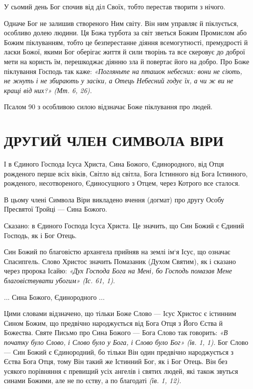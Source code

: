 \documentclass[main.tex]{subfiles}
\begin{document}
У сьомий день Бог спочив від діл Своїх, тобто перестав творити з нічого.

Одначе Бог не залишив створеного Ним світу. Він ним управляє й піклується, особливо долею людини. Ця Божа турбота за світ зветься Божим Промислом або Божим піклуванням, тобто це безперестанне діяння всемогутності, премудрості й ласки Божої, якими Бог оберігає життя й сили творінь та все скеровує до доброї мети на користь їм, перешкоджає діянню зла й повертає його на добро. Про Боже піклування Господь так каже: \emph{{\color{red} «Погляньте на пташок небесних: вони не сіють, не жнуть і не збирають у засіки, а Отець Небесний годує їх, а чи ж ви не кращі від них?»} (Мт. 6, 26).}

Псалом 90 з особливою силою відзначає Боже піклування про людей.

\section{ДРУГИЙ ЧЛЕН СИМВОЛА ВІРИ}
\begin{FlushRight}
    І в Єдиного Господа Ісуса Христа, Сина Божого, Єдинородного, від Отця рожденого перше всіх віків, Світло від світла, Бога Істинного від Бога Істинного, рожденого, несотвореного, Єдиносущного з Отцем, через Котрого все сталося.
\end{FlushRight}

В цьому члені Символа Віри викладено вчення (догмат) про другу Особу Пресвятої Тройці — Сина Божого.

Сказано: в Єдиного Господа Ісуса Христа. Це значить, що Син Божий є Єдиний Господь, як і Бог Отець.
 
Син Божий по благовістю архангела прийняв на землі ім`я Ісус, що означає Спасипгель. Слово Христос значить Помазаник (Духом Святим), як і сказано через пророка Ісайю: \emph{{\color{red} «Дух Господа Бога на Мені, бо Господь помазав Мене благовіствувати убогим»} (Іс. 61, 1)}.

... Сина Божого, Єдинородного ...

Цими словами відзначено, що тільки Боже Слово — Ісус Христос є істинним Сином Божим, що предвічно народжується від Бога Отця з Його Єства й Божества. Святе Письмо про Сина Божого — Бога Слово так говорить: \emph{«В початку було Слово, і Слово було у Бога, і Слово було Бог» (їв. 1, 1).}
Бог Слово — Син Божий є Єдинородний, бо тільки Він один предвічно народжується з Єства Бога Отця, тому Він такий же Істинний Бог, як і Бог Отець. Він без усякого порівняння є превищий усіх ангелів і святих людей, які також звуться синами Божими, але не по єству, а по благодаті \emph{(їв. 1, 12).}
\end{document}
